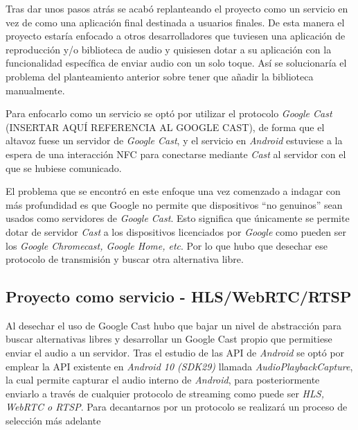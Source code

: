 Tras dar unos pasos atrás se acabó replanteando el proyecto como un servicio en
vez de como una aplicación final destinada a usuarios finales. De esta manera el
proyecto estaría enfocado a otros desarrolladores que tuviesen una aplicación de
reproducción y/o biblioteca de audio y quisiesen dotar a su aplicación con la
funcionalidad específica de enviar audio con un solo toque. Así se
solucionaría el problema del planteamiento anterior sobre tener que añadir la
biblioteca manualmente.

Para enfocarlo como un servicio se optó por utilizar el protocolo \emph{Google
Cast} (INSERTAR AQUÍ REFERENCIA AL GOOGLE CAST), de forma que el altavoz fuese
un servidor de \emph{Google Cast}, y el servicio en \emph{Android} estuviese a
la espera de una interacción NFC para conectarse mediante \emph{Cast} al
servidor con el que se hubiese comunicado.

El problema que se encontró en este enfoque una vez comenzado a indagar con más
profundidad es que Google no permite que dispositivos ``no genuinos'' sean
usados como servidores de \emph{Google Cast}. Esto significa que únicamente se
permite dotar de servidor \emph{Cast} a los dispositivos licenciados por
\emph{Google} como pueden ser los \emph{Google Chromecast, Google Home, etc}.
Por lo que hubo que desechar ese protocolo de transmisión y buscar otra
alternativa libre.

\subsection{Proyecto como servicio - HLS/WebRTC/RTSP}

Al desechar el uso de Google Cast hubo que bajar un nivel de abstracción para
buscar alternativas libres y desarrollar un Google Cast propio que permitiese
enviar el audio a un servidor. Tras el estudio de las API de \emph{Android} se
optó por emplear la API existente en \emph{Android 10 (SDK29)} llamada
\emph{AudioPlaybackCapture}, la cual permite capturar el audio interno de
\emph{Android}, para posteriormente enviarlo a través de cualquier protocolo de
streaming como puede ser \emph{HLS, WebRTC o RTSP}. Para decantarnos por un
protocolo se realizará un proceso de selección más adelante